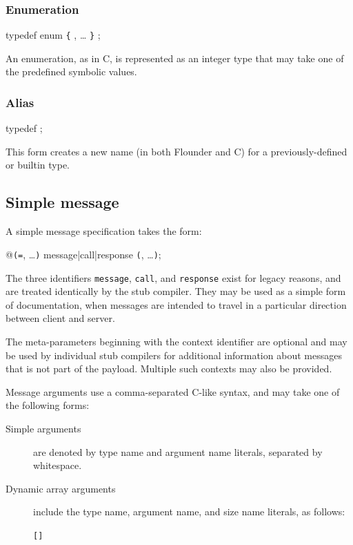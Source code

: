 \documentclass[a4paper,twoside]{report} %
\begin{document}
\subsubsection{Enumeration}

\begin{syntax}
typedef enum \verb+{+
  ,
  \ldots
\verb+}+ ;
\end{syntax}

An enumeration, as in C, is represented as an integer type that may take
one of the predefined symbolic values.

\subsubsection{Alias}

\begin{syntax}
typedef  ;
\end{syntax}

This form creates a new name (in both Flounder and C) for a
previously-defined or builtin type.


\subsection{Simple message}\label{sec:lang:message}

A simple message specification takes the form:

\begin{syntax}
@\verb+(+\verb+=+, \ldots \verb+)+ 
message|call|response  \verb+(+, \ldots \verb+)+;
\end{syntax}

The three identifiers \texttt{message}, \texttt{call}, and \texttt{response}
exist for legacy reasons, and are treated identically by the stub compiler.
They may be used as a simple form of documentation, when messages are intended
to travel in a particular direction between client and server.

The meta-parameters beginning with the context identifier are optional and may
be used by individual stub compilers for additional information about messages
that is not part of the payload. Multiple such contexts may also be provided.

Message arguments use a comma-separated C-like syntax, and may take one of the
following forms:

\begin{description}
 \item[Simple arguments] are denoted by type name and argument name literals,
separated by whitespace.
 \item[Dynamic array arguments] include the type name, argument name, and size
name literals, as follows:
\begin{syntax}
 \verb+[+\verb+]+
\end{syntax}
\end{description}
\end{document}
